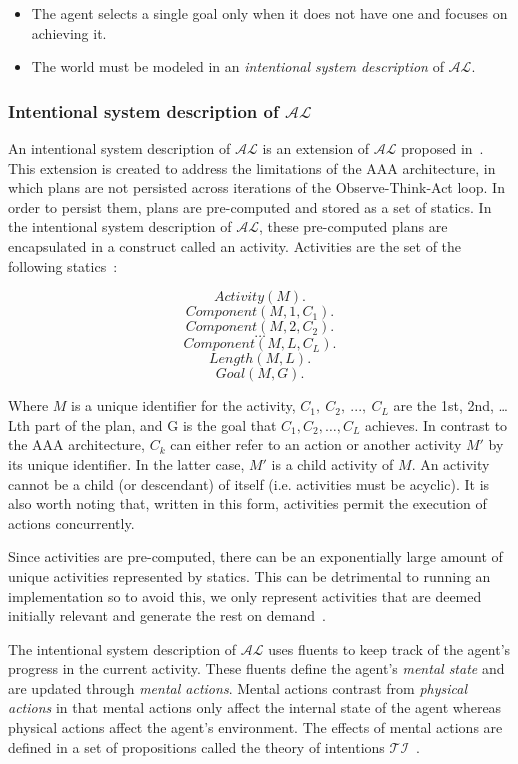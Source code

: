 \begin{itemize}
    \item The agent selects a single goal only when it does not have one and focuses on achieving it.
    \item The world must be modeled in an \textit{intentional system description} of $\mathcal{AL}$.
\end{itemize}

\subsubsection{Intentional system description of $\mathcal{AL}$}
\label{subsubsec:intentional_action_language_al}

An intentional system description of $ \mathcal{AL} $ is an extension of $ \mathcal{AL} $ proposed in~\cite{blount_architecture_2013}.
This extension is created to address the limitations of the AAA architecture, in which plans are not persisted across iterations of the Observe-Think-Act loop.
In order to persist them, plans are pre-computed and stored as a set of statics.
In the intentional system description of $\mathcal{AL}$, these pre-computed plans are encapsulated in a construct called an activity.
Activities are the set of the following statics~\cite{blount_architecture_2013, blount_towards_2014}:

$$
Activity(M).
$$
$$
Component(M, 1, C_1).
$$
$$
Component(M, 2, C_2).
$$
$$
\dots
$$
$$
Component(M, L, C_L).
$$
$$
Length(M, L).
$$
$$
Goal(M, G).
$$

Where $M$ is a unique identifier for the activity, $C_1,\ C_2,\ ...,\ C_L$ are the 1st, 2nd, … Lth part of the plan, and G is the goal that $C_1,C_2,\ldots,C_L$ achieves.
In contrast to the AAA architecture, $C_k$ can either refer to an action or another activity $M'$ by its unique identifier.
In the latter case, $M'$ is a child activity of $M$.
An activity cannot be a child (or descendant) of itself (i.e. activities must be acyclic).
It is also worth noting that, written in this form, activities permit the execution of actions concurrently.

Since activities are pre-computed, there can be an exponentially large amount of unique activities represented by statics.
This can be detrimental to running an implementation so to avoid this, we only represent activities that are deemed initially relevant and generate the rest on demand~\cite{blount_architecture_2013}.

The intentional system description of $\mathcal{AL}$ uses fluents to keep track of the agent's progress in the current activity.
These fluents define the agent's \textit{mental state} and are updated through \textit{mental actions}.
Mental actions contrast from \textit{physical actions} in that mental actions only affect the internal state of the agent whereas physical actions affect the agent's environment.
The effects of mental actions are defined in a set of propositions called the theory of intentions $\mathcal{TI}$~\cite{blount_towards_2014}.

